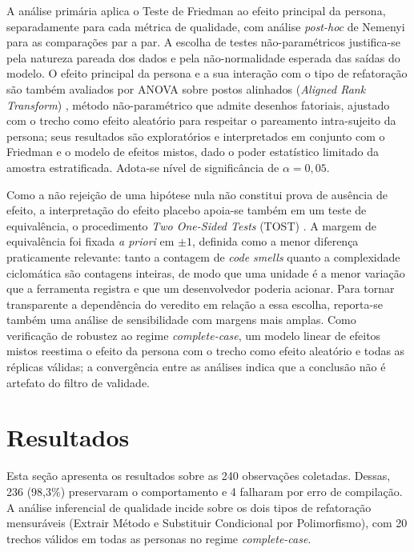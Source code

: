 \documentclass[10pt,conference,a4paper,twocolumn]{article}
\begin{document}
A análise primária aplica o Teste de Friedman ao efeito principal da persona, separadamente para cada métrica de qualidade, com análise \textit{post-hoc} de Nemenyi para as comparações par a par. A escolha de testes não-paramétricos justifica-se pela natureza pareada dos dados e pela não-normalidade esperada das saídas do modelo. O efeito principal da persona e a sua interação com o tipo de refatoração são também avaliados por ANOVA sobre postos alinhados (\textit{Aligned Rank Transform}) \cite{wobbrock2011}, método não-paramétrico que admite desenhos fatoriais, ajustado com o trecho como efeito aleatório para respeitar o pareamento intra-sujeito da persona; seus resultados são exploratórios e interpretados em conjunto com o Friedman e o modelo de efeitos mistos, dado o poder estatístico limitado da amostra estratificada. Adota-se nível de significância de $\alpha = 0{,}05$.

Como a não rejeição de uma hipótese nula não constitui prova de ausência de efeito, a interpretação do efeito placebo apoia-se também em um teste de equivalência, o procedimento \textit{Two One-Sided Tests} (TOST) \cite{lakens2017}. A margem de equivalência foi fixada \textit{a priori} em $\pm 1$, definida como a menor diferença praticamente relevante: tanto a contagem de \textit{code smells} quanto a complexidade ciclomática são contagens inteiras, de modo que uma unidade é a menor variação que a ferramenta registra e que um desenvolvedor poderia acionar. Para tornar transparente a dependência do veredito em relação a essa escolha, reporta-se também uma análise de sensibilidade com margens mais amplas. Como verificação de robustez ao regime \textit{complete-case}, um modelo linear de efeitos mistos \cite{pinheiro2000} reestima o efeito da persona com o trecho como efeito aleatório e todas as réplicas válidas; a convergência entre as análises indica que a conclusão não é artefato do filtro de validade.

\section{Resultados}
Esta seção apresenta os resultados sobre as 240 observações coletadas. Dessas, 236 (98,3\%) preservaram o comportamento e 4 falharam por erro de compilação. A análise inferencial de qualidade incide sobre os dois tipos de refatoração mensuráveis (Extrair Método e Substituir Condicional por Polimorfismo), com 20 trechos válidos em todas as personas no regime \textit{complete-case}.
\end{document}
